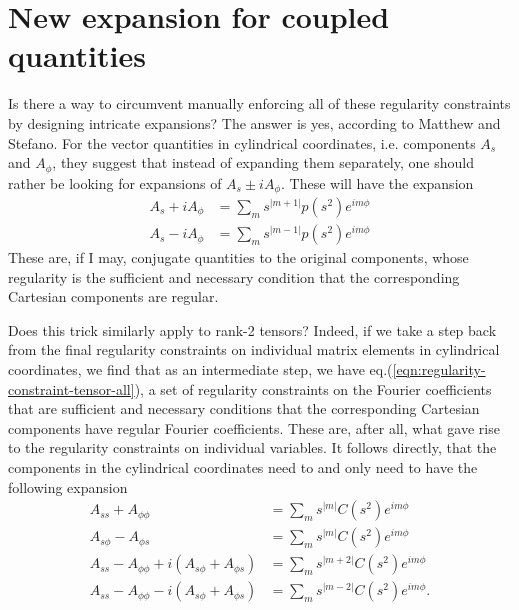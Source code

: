 \section{New expansion for coupled quantities}


Is there a way to circumvent manually enforcing all of these regularity constraints by designing intricate expansions?
The answer is yes, according to Matthew and Stefano.
For the vector quantities in cylindrical coordinates, i.e. components $A_s$ and $A_\phi$, they suggest that instead of expanding them separately, one should rather be looking for expansions of $A_s \pm i A_\phi$. These will have the expansion
\[\begin{aligned}
    A_s + iA_\phi &= \sum_m s^{|m+1|} p(s^2) e^{im\phi} \\ 
    A_s - iA_\phi &= \sum_m s^{|m-1|} p(s^2) e^{im\phi}
\end{aligned}\]
These are, if I may, conjugate quantities to the original components, whose regularity is the sufficient and necessary condition that the corresponding Cartesian components are regular.

Does this trick similarly apply to rank-2 tensors?
Indeed, if we take a step back from the final regularity constraints on individual matrix elements in cylindrical coordinates, we find that as an intermediate step, we have eq.(\ref{eqn:regularity-constraint-tensor-all}), a set of regularity constraints on the Fourier coefficients that are sufficient and necessary conditions that the corresponding Cartesian components have regular Fourier coefficients.
These are, after all, what gave rise to the regularity constraints on individual variables.
It follows directly, that the components in the cylindrical coordinates need to and only need to have the following expansion
\begin{equation}
    \begin{aligned}
        A_{ss} + A_{\phi\phi} &= \sum_{m} s^{|m|} C(s^2) e^{im\phi} \\ 
        A_{s\phi} - A_{\phi s} &= \sum_{m} s^{|m|} C(s^2) e^{im\phi} \\ 
        A_{ss} - A_{\phi\phi} + i \left(A_{s\phi} + A_{\phi s}\right) &= \sum_{m} s^{|m + 2|} C(s^2) e^{im\phi} \\ 
        A_{ss} - A_{\phi\phi} - i \left(A_{s\phi} + A_{\phi s}\right) &= \sum_{m} s^{|m - 2|} C(s^2) e^{im\phi}.
    \end{aligned}
\end{equation}

